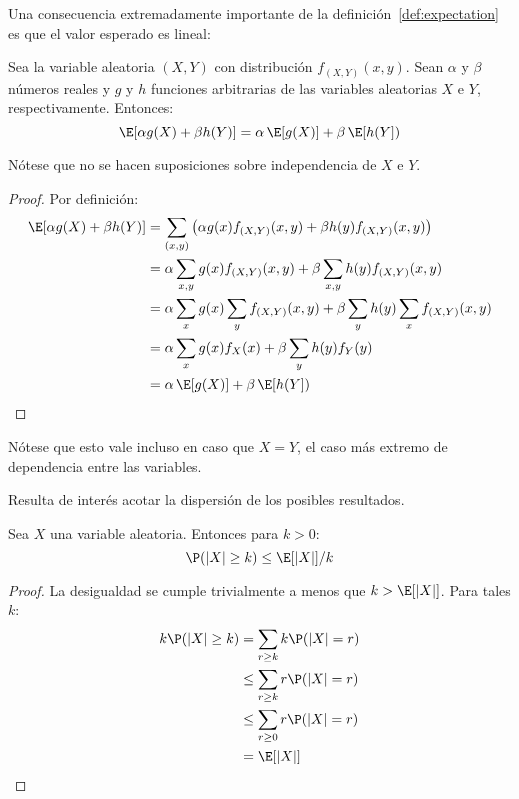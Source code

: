   Una consecuencia extremadamente importante
  de la definición~\ref{def:expectation}
  es que el valor esperado es lineal:%
  \begin{theorem}
    \label{theo:expectation-linear}
    Sea la variable aleatoria \((X, Y)\)
    con distribución \(f_{(X, Y)}(x, y)\).
    Sean \(\alpha\) y \(\beta\) números reales
    y \(g\) y \(h\) funciones arbitrarias
    de las variables aleatorias \(X\) e \(Y\),
    respectivamente.
    Entonces:
    \begin{equation*}
      \E[\alpha g(X) + \beta h(Y)]
	= \alpha \, \E[g(X)] + \beta \, \E[h(Y])
    \end{equation*}
  \end{theorem}
  Nótese que no se hacen suposiciones
  sobre independencia de \(X\) e \(Y\).
  \begin{proof}
    Por definición:
    \begin{align*}
      \E[\alpha g(X) + \beta h(Y)]
	&= \sum_{(x, y)}
	    \left(
	      \alpha g(x) f_{(X, Y)}(x, y)
		+ \beta h(y) f_{(X, Y)} (x, y)
	      \right) \\
	&= \alpha \sum_{x, y} g(x) f_{(X, Y)}(x, y)
	     + \beta \sum_{x, y} h(y) f_{(X, Y)}(x, y) \\
	&= \alpha \sum_x g(x) \sum_y f_{(X, Y)}(x, y)
	     + \beta \sum_y h(y) \sum_x f_{(X, Y)}(x, y) \\
	&= \alpha \sum_x g(x) f_X(x)
	     + \beta \sum_y h(y) f_Y(y) \\
	&= \alpha \, \E[g(X)] + \beta \, \E[h(Y])
      \qedhere
    \end{align*}
  \end{proof}
  Nótese que esto vale incluso en caso que \(X = Y\),
  el caso más extremo de dependencia entre las variables.

  Resulta de interés acotar la dispersión de los posibles resultados.
  \begin{theorem}
    \label{theo:Markov-inequality}
    Sea \(X\) una variable aleatoria.
    Entonces para \(k > 0\):
    \begin{equation}
      \label{eq:Markov-inequality}
      \P(\lvert X \rvert \ge k)
	\le \E[ \lvert X \rvert ] / k
    \end{equation}
  \end{theorem}
  \begin{proof}
    La desigualdad se cumple trivialmente
    a menos que \(k > \E[ \lvert X \rvert ]\).
    Para tales \(k\):
    \begin{align*}
      k \P(\lvert X \rvert \ge k)
	&=  \sum_{r \ge k} k \P(\lvert X \rvert = r) \\
	&\le \sum_{r \ge k} r \P(\lvert X \rvert = r) \\
	&\le \sum_{r \ge 0} r \P(\lvert X \rvert = r) \\
	&=  \E[ \lvert X \rvert ]
    \qedhere
    \end{align*}
  \end{proof}

